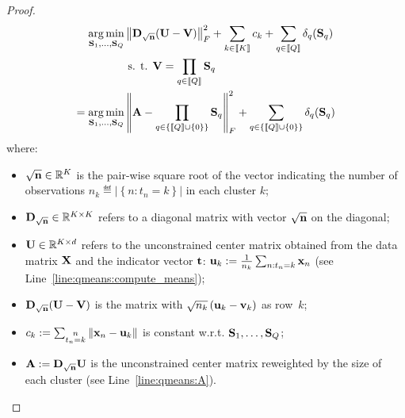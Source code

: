 \begin{proof}
\begin{align}
 \operatorname*{arg\,min}_{{\mathbf{S}}_1, \ldots,{\mathbf{S}}_Q} & \left \| {\mathbf{D}}_{\sqrt{{\mathbf{n}}}} ({\mathbf{U}} - {\mathbf{V}})\right \|_F^2 + \sum_{k\in\left \llbracket K\right \rrbracket} c_k + \sum_{q\in\left \llbracket Q\right \rrbracket} \delta_q({\mathbf{S}}_q) \notag \\
 & \text{ s. t. } {\mathbf{V}} = \prod_{q\in\left \llbracket Q\right \rrbracket}{{\mathbf{S}}_q} \nonumber\\
 = \operatorname*{arg\,min}_{{\mathbf{S}}_1, \ldots,{\mathbf{S}}_Q} & \left \| {\mathbf{A}} - \prod_{q\in\left\{\left \llbracket Q\right \rrbracket \cup \{0\}\right\}}{{\mathbf{S}}_q}\right \|_F^2 + \sum_{q\in\left\{\left \llbracket Q\right \rrbracket \cup \{0\}\right\}} \delta_q({\mathbf{S}}_q) \notag \\
 \label{eq:qmeans_problem_t_fixed}
 \end{align}
%
where:
%
\begin{itemize}
 \item $\sqrt{{\mathbf{n}}} \in \mathbb{R}^{K}$ is the pair-wise square root of the vector indicating the number of observations $n_k \eqdef \left | \left \lbrace n: t_n = k\right \rbrace \right |$  in each cluster $k$;
 \item ${\mathbf{D}}_{\sqrt{{\mathbf{n}}}} \in \mathbb{R}^{K \times K}$ refers to a diagonal matrix with vector $\sqrt{{\mathbf{n}}}$ on the diagonal;
 \item ${\mathbf{U}}\in \mathbb{R}^{K \times d}$ refers to the unconstrained center matrix obtained from the data matrix ${\mathbf{X}}$ and the indicator vector ${\mathbf{t}}$: ${\mathbf{u}}_k := \frac{1}{n_k}\sum_{n:t_n = k} {{\mathbf{x}}_n}$ (see Line~\ref{line:qmeans:compute_means});
 \item ${\mathbf{D}}_{\sqrt{{\mathbf{n}}}} ({\mathbf{U}} - {\mathbf{V}})$ is the matrix with $\sqrt{n_k}\left ({\mathbf{u}}_k-{\mathbf{v}}_k\right )$ as row~$k$;
 \item $c_k := \sum_{\substack{n\\t_n = k}}\left \| {\mathbf{x}}_n - {\mathbf{u}}_k\right \|$ is constant w.r.t. $ {\mathbf{S}}_1, \ldots,{\mathbf{S}}_Q$;
 \item ${\mathbf{A}} := {\mathbf{D}}_{\sqrt{{\mathbf{n}}}} {\mathbf{U}}$ is the unconstrained center matrix reweighted by the size of each cluster (see Line~\ref{line:qmeans:A}).
\end{itemize}


\end{proof}
